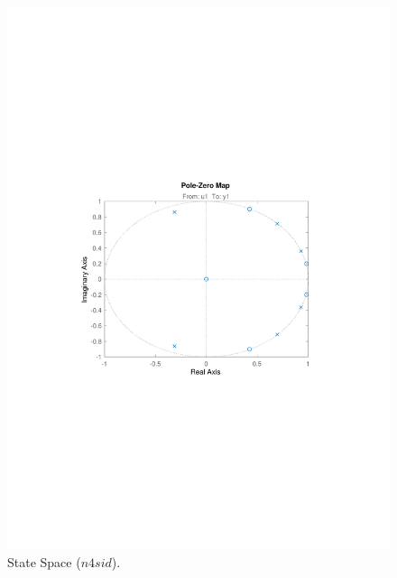 \documentclass[]{article}
\begin{document}
\begin{figure}[ht]
\centering
\includegraphics[trim= 10cm 8cm 10cm 8cm, scale=0.7]{figures/pz_n4sid_66.pdf}
\caption{State Space ($n4sid$).}
\label{fig:pzplot_ss}
\end{figure}
\end{document}
